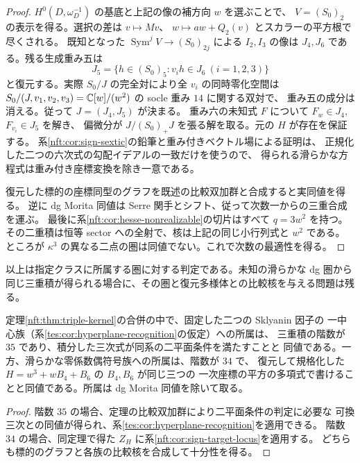 \begin{proof}
$H^0(D,\omega_D^{-1})$ の基底と上記の像の補方向 $w$ を選ぶことで、
$V=(S_0)_2$ の表示を得る。選択の差は $v\mapsto Mv$、
$w\mapsto aw+Q_2(v)$ とスカラーの平方根で尽くされる。
既知となった $\operatorname{Sym}^jV\to(S_0)_{2j}$ による
$I_2,I_3$ の像は $J_4,J_6$ である。残る生成重み五は
\[
 J_5=\{h\in(S_0)_5:v_ih\in J_6\ (i=1,2,3)\}
\]
と復元する。実際 $S_0/J$ の完全対により全 $v_i$ の同時零化空間は
$S_0/(J,v_1,v_2,v_3)=\mathbb C[w]/(w^2)$ の socle 重み $14$ に関する双対で、
重み五の成分は消える。従って $J=(J_4,J_5)$ が決まる。
重み六の未知式 $F$ について $F_w\in J_4$, $F_{v_i}\in J_5$ を解き、
偏微分が $J/(S_0)_+J$ を張る解を取る。元の $H$ が存在を保証する。
系\ref{nft:cor:sign-sextic}の鉛筆と重み付きベクトル場による証明は、
正規化した二つの六次式の勾配イデアルの一致だけを使うので、
得られる滑らかな方程式は重み付き座標変換を除き一意である。

復元した標的の座標同型のグラフを既述の比較双加群と合成すると実同値を得る。
逆に dg Morita 同値は Serre 関手とシフト、従って次数一からの三重合成を運ぶ。
最後に系\ref{nft:cor:hesse-nonrealizable}の切片はすべて $q=3w^2$ を持つ。
その二重積は恒等 sector への全射で、核は上記の同じ小行列式と $w^2$ である。
ところが $\kappa^3$ の異なる二点の圏は同値でない。これで次数の最適性を得る。
\end{proof}
以上は指定クラスに所属する圏に対する判定である。未知の滑らかな dg 圏から
同じ三重積が得られる場合に、その圏と復元多様体との比較核を与える問題は残る。

\begin{corollary}[指定二因子族と零係数偶符号族の識別]
\label{nft:cor:triple-family}
定理\ref{nft:thm:triple-kernel}の合併の中で、固定した二つの Sklyanin 因子の
一中心族（系\ref{tes:cor:hyperplane-recognition}の仮定）への所属は、
三重積の階数が $35$ であり、積分した三次式が同系の二平面条件を満たすことと
同値である。一方、滑らかな零係数偶符号族への所属は、階数が $34$ で、
復元して規格化した $H=w^3+wB_4+B_6$ の $B_4,B_6$ が同じ三つの
一次座標の平方の多項式で書けることと同値である。所属は dg Morita 同値を除いて取る。
\end{corollary}
\begin{proof}
階数 $35$ の場合、定理の比較双加群により二平面条件の判定に必要な
可換三次との同値が得られ、系\ref{tes:cor:hyperplane-recognition}を適用できる。
階数 $34$ の場合、同定理で得た $Z_H$ に系\ref{nft:cor:sign-target-locus}を適用する。
どちらも標的のグラフと各族の比較核を合成して十分性を得る。
\end{proof}

